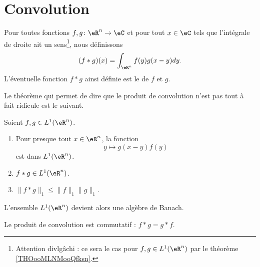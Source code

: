 \section{Convolution}


\begin{definition}      \label{DEFooHHCMooHzfStu}
    Pour toutes fonctions \( f,g\colon \eR^n\to \eC\) et pour tout \( x\in \eC\) tels que l'intégrale de droite ait un sens\footnote{Attention divlgâchi : ce sera le cas pour \( f,g\in L^1(\eR^n)\) par le théorème \ref{THOooMLNMooQfksn}.}, nous définissons
    \begin{equation}
        (f*g)(x)=\int_{\eR^n} f(y)g(x-y)dy.
    \end{equation}
    L'éventuelle fonction \( f*g\) ainsi définie est le  de \( f\) et \( g\).
\end{definition}

Le théorème qui permet de dire que le produit de convolution n'est pas tout à fait ridicule est le suivant.

\begin{theorem}     \label{THOooMLNMooQfksn}
    Soient \( f,g\in L^1(\eR^n)\).
    \begin{enumerate}
        \item
            Pour presque tout \( x\in \eR^n\), la fonction
            \begin{equation}
                y\mapsto g(x-y)f(y)
            \end{equation}
            est dans \( L^1(\eR^n)\).
        \item
            \( f*g\in L^1(\eR^n)\).
        \item
            \( \| f*g \|_1\leq \| f \|_1\| g \|_1\).
    \end{enumerate}
\end{theorem}

\begin{proposition}     \label{PROPooNBHNooInwoar}
    L'ensemble \( L^1(\eR^n)\) devient alors une algèbre de Banach.
\end{proposition}

\begin{lemma}
    Le produit de convolution est commutatif : \( f*g=g*f\).
\end{lemma}

